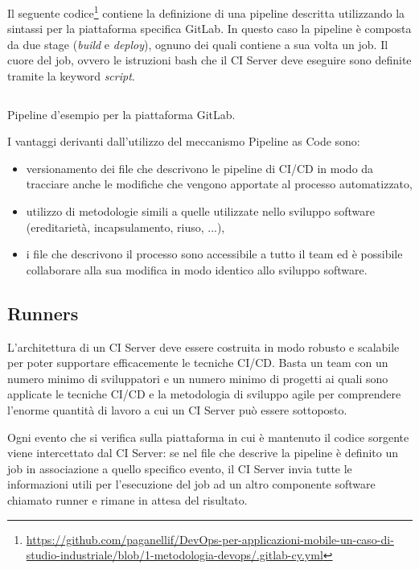 Il seguente codice\footnote{\href{https://github.com/paganellif/DevOps-per-applicazioni-mobile-un-caso-di-studio-industriale/blob/1-metodologia-devops/.gitlab-cy.yml}{https://github.com/paganellif/DevOps-per-applicazioni-mobile-un-caso-di-studio-industriale/blob/1-metodologia-devops/.gitlab-cy.yml}} contiene la definizione di una pipeline descritta utilizzando la sintassi per la piattaforma specifica GitLab. In questo caso la pipeline è composta da due stage (\textit{build} e \textit{deploy}), ognuno dei quali contiene a sua volta un job. Il cuore del job, ovvero le istruzioni bash che il CI Server deve eseguire sono definite tramite la keyword \textit{script}.

\begin{listing}[H]
    \inputminted{yaml}{code/3-pipelineexample}
    \caption{Pipeline d'esempio per la piattaforma GitLab.}
\end{listing}

I vantaggi derivanti dall'utilizzo del meccanismo Pipeline as Code sono:
\begin{itemize}
    \item versionamento dei file che descrivono le pipeline di CI/CD in modo da tracciare anche le modifiche che vengono apportate al processo automatizzato,
    \item utilizzo di metodologie simili a quelle utilizzate nello sviluppo software (ereditarietà, incapsulamento, riuso, ...),
    \item i file che descrivono il processo sono accessibile a tutto il team ed è possibile collaborare alla sua modifica in modo identico allo sviluppo software.
\end{itemize}

\subsection{Runners}
L'architettura di un CI Server deve essere costruita in modo robusto e scalabile per poter supportare efficacemente le tecniche CI/CD. Basta un team con un numero minimo di sviluppatori e un numero minimo di progetti ai quali sono applicate le tecniche CI/CD e la metodologia di sviluppo agile per comprendere l'enorme quantità di lavoro a cui un CI Server può essere sottoposto.

Ogni evento che si verifica sulla piattaforma in cui è mantenuto il codice sorgente viene intercettato dal CI Server: se nel file che descrive la pipeline è definito un job in associazione a quello specifico evento, il CI Server invia tutte le informazioni utili per l'esecuzione del job ad un altro componente software chiamato runner e rimane in attesa del risultato. 

